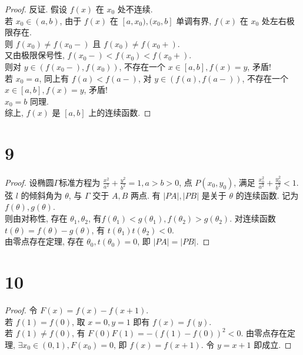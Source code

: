 \documentclass{article}
\begin{document}
\begin{proof}
    反证. 假设 $f(x)$ 在 $x_0$ 处不连续. \\
    若 $x_0 \in (a, b)$, 由于 $f(x)$ 在 $[a, x_0), (x_0, b]$ 单调有界, $f(x)$ 在 $x_0$ 处左右极限存在. \\
    则 $f(x_0) \neq f(x_0 -)$ 且 $f(x_0) \neq f(x_0 +)$. \\
    又由极限保号性, $f(x_0 -) < f(x_0) <  f(x_0 +)$. \\
    则对 $y \in (f(x_0 -), f(x_0))$, 不存在一个 $x \in [a, b], f(x) = y$, 矛盾! \\
    若 $x_0 = a$, 同上有 $f(a) < f(a-)$, 对 $y \in (f(a), f(a-))$, 不存在一个 $x \in [a, b], f(x) = y$, 矛盾! \\
    $x_0 = b$ 同理. \\
    综上, $f(x)$ 是 $[a, b]$ 上的连续函数.
\end{proof}

\section*{9}

\begin{proof}
    设椭圆$\varGamma$标准方程为 $\displaystyle{\frac{x^2}{a^2} + \frac{y^2}{b^2} = 1, a > b > 0}$, 
    点 $P(x_0, y_0)$, 满足 $\displaystyle{\frac{x_0^2}{a^2} + \frac{y_0^2}{b^2} < 1}$.\\
    弦 $l$ 的倾斜角为 $\theta$, 与 $\varGamma$ 交于 $A, B$ 两点. 有 $\left\lvert PA\right\rvert, \left\lvert PB\right\rvert $ 是关于 $ \theta$ 的连续函数. 记为 $f(\theta), g(\theta)$. \\
    则由对称性, 存在 $\theta_1, \theta_2$, 有$f(\theta_1) < g(\theta_1), f(\theta_2) > g(\theta_2)$. 
    对连续函数 $t(\theta) = f(\theta) - g(\theta)$, 有 $t(\theta_1)t(\theta_2) < 0$. \\
    由零点存在定理, 存在 $\theta_0, t(\theta_0) = 0$, 即 $ \left\lvert PA\right\rvert = \left\lvert PB\right\rvert $.
\end{proof}

\section*{10}

\begin{proof}
    令 $F(x) = f(x) - f(x + 1)$. \\
    若 $f(1) = f(0)$, 取 $x = 0, y = 1$ 即有 $f(x) = f(y)$. \\
    若 $f(1) \neq f(0)$, 有 $F(0)F(1) = -(f(1) - f(0))^2 < 0$. 由零点存在定理, $\exists x_0 \in (0, 1), F(x_0) = 0$, 即 $f(x) = f(x + 1)$. 令 $y = x + 1$ 即成立. 
\end{proof}
\end{document}

